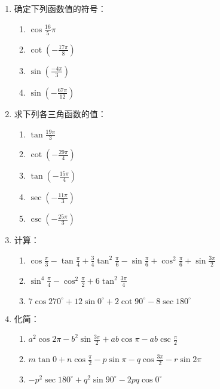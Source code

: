\begin{enumerate}
    \item 确定下列函数值的符号：
\begin{multicols}{2}
\begin{enumerate}[(1)]
    \item $\cos\frac{16}{5}\pi$
    \item $\cot\left(-\frac{17\pi}{8}\right)$
    \item $\sin\left(\frac{-4\pi}{3}\right)$
    \item $\sin\left(-\frac{67\pi}{12}\right)$
\end{enumerate}
\end{multicols}

\item 求下列各三角函数的值：
\begin{multicols}{3}
\begin{enumerate}[(1)]
    \item $\tan\frac{19\pi}{3}$
    \item $\cot\left(-\frac{29\pi}{4}\right)$
    \item $\tan\left(-\frac{15\pi}{4}\right)$
    \item $\sec\left(-\frac{11\pi}{3}\right)$
    \item $\csc\left(-\frac{25\pi}{3}\right)$
\end{enumerate}
\end{multicols}

\item 计算：
\begin{enumerate}[(1)]
    \item $\cos\frac{\pi}{3}-\tan\frac{\pi}{4}+\frac{3}{4}\tan^2 \frac{\pi}{6}-\sin\frac{\pi}{6}+\cos^2\frac{\pi}{6}+\sin\frac{3\pi}{2}$
    \item $\sin^4 \frac{\pi}{4}-\cos^2\frac{\pi}{2}+6\tan^2\frac{3\pi}{4}$
    \item $7\cos270^{\circ}+12\sin 0^{\circ}+2\cot 90^{\circ}-8\sec 180^{\circ}$
\end{enumerate}

\item 化简：
\begin{enumerate}[(1)]
    \item $a^2\cos 2\pi-b^2\sin\frac{3\pi}{2}+ab\cos \pi-ab\csc\frac{\pi}{2}$
    \item $m\tan0+n\cos\frac{\pi}{2}-p\sin\pi-q\cos\frac{3\pi}{2}-r\sin 2\pi$
    \item $-p^2\sec180^{\circ}+q^2\sin 90^{\circ}-2pq\cos 0^{\circ}$
\end{enumerate}


\end{enumerate}
